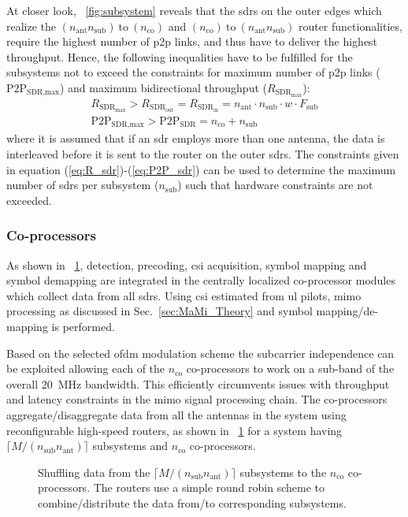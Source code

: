 \documentclass[journal]{IEEEtran}
\begin{document}
%
At closer look, \figurename~\ref{fig:subsystem} reveals that the \glspl{sdr} on the outer edges which realize the $(n_\text{ant}n_\text{sub}) \ \text{to}\ (n_\text{co})$ and $(n_\text{co}) \ \text{to}\ (n_\text{ant}n_\text{sub})$ router functionalities, require the highest number of \gls{p2p} links, and thus have to deliver the highest throughput.
Hence, the following inequalities have to be fulfilled for the subsystems not to exceed the constraints for maximum number of \gls{p2p} links ($\text{P2P}_\text{SDR,max}$) and maximum bidirectional throughput ($R_{\text{SDR}_\text{max}}$):
\begin{align}
R_{\text{SDR}_\text{max}} > R_{\text{SDR}_\text{out}}=R_{\text{SDR}_\text{in}}=n_\text{ant}\cdot n_\text{sub}\cdot w\cdot F_\text{sub} \label{eq:R_sdr}\\
\text{P2P}_\text{SDR,max} > \text{P2P}_\text{SDR} = n_\text{co}+n_\text{sub}\label{eq:P2P_sdr}
\end{align}
where it is assumed that if an \gls{sdr} employs more than one antenna, the data is interleaved before it is sent to the router on the outer \glspl{sdr}.
The constraints given in equation (\ref{eq:R_sdr})-(\ref{eq:P2P_sdr}) can be used to determine the maximum number of \glspl{sdr} per subsystem ($n_\text{sub}$) such that hardware constraints are not exceeded. 
%
%
%
%

\subsubsection{Co-processors} 
%
As shown in \figurename~\ref{fig:Co_processors}, detection, precoding, \gls{csi} acquisition, symbol mapping and symbol demapping are integrated in the centrally localized co-processor modules which collect data from all \glspl{sdr}. 
Using \gls{csi} estimated from \gls{ul} pilots, \gls{mimo} processing as discussed in Sec.~\ref{sec:MaMi_Theory} and symbol mapping/de-mapping is performed.  
%
%

Based on the selected \gls{ofdm} modulation scheme the subcarrier independence can be exploited allowing each of the $n_\text{co}$ co-processors to work on a sub-band of the overall \SI{20}{\mega\hertz} bandwidth.
This efficiently circumvents issues with throughput and latency constraints in the \gls{mimo} signal processing chain.
%
The co-processors aggregate/disaggregate data from all the antennas in the system using reconfigurable high-speed routers, as shown in \figurename~\ref{fig:Co_processors} for a system having $\lceil M/(n_\text{sub}n_\text{ant})\rceil$ subsystems and $n_\text{co}$ co-processors.
%
%
%
%
%
%
\begin{figure}
	\centering
	\hspace*{0pt}
	\caption{Shuffling data from the $\lceil M/(n_\text{sub}n_\text{ant})\rceil$ subsystems to the $n_\text{co}$ co-processors. The routers use a simple round robin scheme to combine/distribute the data from/to corresponding subsystems.}
	\label{fig:Co_processors}
\end{figure}
\end{document}
